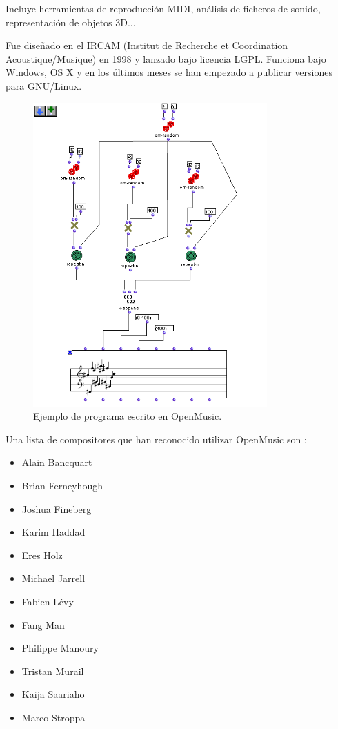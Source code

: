 \documentclass[a4paper,openany,12pt]{memoir}
\begin{document}
Incluye herramientas de reproducción MIDI, análisis de ficheros de sonido, representación de objetos 3D...

Fue diseñado en el IRCAM (Institut de Recherche et Coordination Acoustique/Musique) en 1998 y lanzado bajo licencia LGPL. Funciona bajo Windows, OS X y en los últimos meses se han empezado a publicar versiones para GNU/Linux.

\begin{figure}
\centering
\includegraphics[width=0.8\textwidth]{img/Om_patch.png} 
\caption{Ejemplo de programa escrito en OpenMusic. \cite{wiki:openmusic}} \label{fig:openmusic}
\end{figure}


Una lista de compositores que han reconocido utilizar OpenMusic son \cite{wiki:openmusic}:

\begin{itemize}
\item Alain Bancquart
\item Brian Ferneyhough
\item Joshua Fineberg
\item Karim Haddad
\item Eres Holz
\item Michael Jarrell
\item Fabien Lévy
\item Fang Man
\item Philippe Manoury
\item Tristan Murail
\item Kaija Saariaho
\item Marco Stroppa
\end{itemize}
\end{document}
